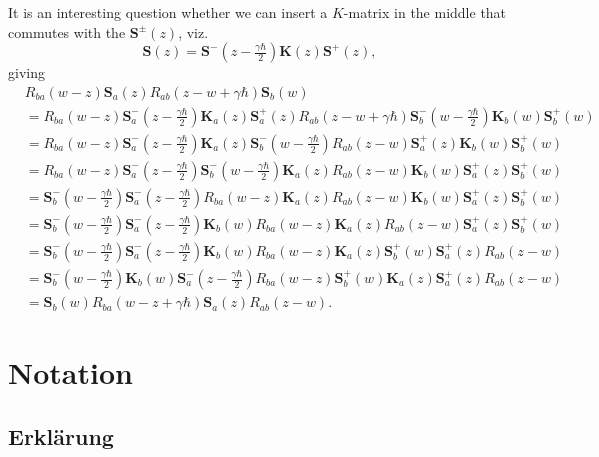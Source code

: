 \documentclass[11pt]{report}
\theoremstyle{definition}
\theoremstyle{remark}
\theoremstyle{remark}
\begin{document}
It is an interesting question whether we can insert a $K$-matrix in the middle that commutes with the $\mathbf{S}^\pm(z)$, viz.
\begin{equation*}
\mathbf{S}(z) = \mathbf{S}^-(z-\tfrac{\gamma\hbar}{2}) \mathbf{K}(z) \mathbf{S}^+(z),
\end{equation*}
giving
\begin{align*}
&R_{ba}(w-z) \mathbf{S}_a(z) R_{ab}(z-w+\gamma\hbar) \mathbf{S}_b(w) \\
&= R_{ba}(w-z) \mathbf{S}_a^-(z-\tfrac{\gamma\hbar}{2}) \mathbf{K}_a(z) \mathbf{S}_a^+(z) R_{ab}(z-w+\gamma\hbar) \mathbf{S}_b^-(w-\tfrac{\gamma\hbar}{2}) \mathbf{K}_b(w) \mathbf{S}_b^+(w) \\
&= R_{ba}(w-z) \mathbf{S}_a^-(z-\tfrac{\gamma\hbar}{2}) \mathbf{K}_a(z) \mathbf{S}_b^-(w-\tfrac{\gamma\hbar}{2}) R_{ab}(z-w) \mathbf{S}_a^+(z) \mathbf{K}_b(w) \mathbf{S}_b^+(w) \\
&= R_{ba}(w-z) \mathbf{S}_a^-(z-\tfrac{\gamma\hbar}{2}) \mathbf{S}_b^-(w-\tfrac{\gamma\hbar}{2}) \mathbf{K}_a(z) R_{ab}(z-w) \mathbf{K}_b(w) \mathbf{S}_a^+(z) \mathbf{S}_b^+(w) \\
&= \mathbf{S}_b^-(w-\tfrac{\gamma\hbar}{2}) \mathbf{S}_a^-(z-\tfrac{\gamma\hbar}{2}) R_{ba}(w-z) \mathbf{K}_a(z) R_{ab}(z-w) \mathbf{K}_b(w) \mathbf{S}_a^+(z) \mathbf{S}_b^+(w) \\
&= \mathbf{S}_b^-(w-\tfrac{\gamma\hbar}{2}) \mathbf{S}_a^-(z-\tfrac{\gamma\hbar}{2}) \mathbf{K}_b(w) R_{ba}(w-z) \mathbf{K}_a(z) R_{ab}(z-w) \mathbf{S}_a^+(z) \mathbf{S}_b^+(w) \\
&= \mathbf{S}_b^-(w-\tfrac{\gamma\hbar}{2}) \mathbf{S}_a^-(z-\tfrac{\gamma\hbar}{2}) \mathbf{K}_b(w) R_{ba}(w-z) \mathbf{K}_a(z) \mathbf{S}_b^+(w) \mathbf{S}_a^+(z) R_{ab}(z-w) \\
&= \mathbf{S}_b^-(w-\tfrac{\gamma\hbar}{2}) \mathbf{K}_b(w) \mathbf{S}_a^-(z-\tfrac{\gamma\hbar}{2}) R_{ba}(w-z) \mathbf{S}_b^+(w) \mathbf{K}_a(z) \mathbf{S}_a^+(z) R_{ab}(z-w) \\
&= \mathbf{S}_b(w) R_{ba}(w-z+\gamma\hbar) \mathbf{S}_a(z) R_{ab}(z-w).
\end{align*}

\pagebreak

\chapter*{Notation}\label{chapter:notation}

\pagebreak

\printindex




\pagebreak

\section*{Erklärung}
\end{document}
